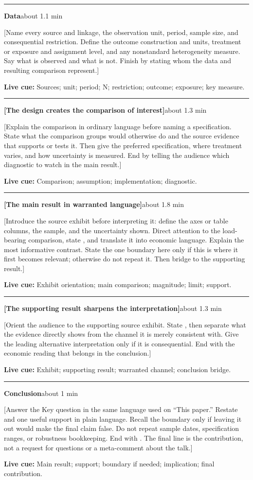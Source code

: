 \documentclass[11pt]{article}
\newcommand{\Cue}[1]{\par\nobreak\smallskip\noindent\textcolor{ScriptGray}{\footnotesize
  \textbf{Live cue:} #1}\par}
\newcommand{\scriptframe}[3]{%
  \Needspace{9\baselineskip}%
  \par\medskip\noindent\textcolor{ScriptBlue}{\rule{\linewidth}{0.55pt}}%
  \par\smallskip\noindent
  \textbf{#1}\hfill\textcolor{ScriptGray}{\small #2}\par\smallskip
  #3\par}
\begin{document}
\scriptframe{Data}{about 1.1 min}{%
  [Name every source and linkage, the observation unit, period, sample size,
  and consequential restriction. Define the outcome construction and units,
  treatment or exposure and assignment level, and any nonstandard
  heterogeneity measure. Say what is observed and what is not. Finish by
  stating whom the data and resulting comparison represent.]
  \Cue{Sources; unit; period; N; restriction; outcome; exposure; key measure.}
}

\scriptframe{[The design creates the comparison of interest]}{about 1.3 min}{%
  [Explain the comparison in ordinary language before naming a specification.
  State what the comparison groups would otherwise do and the source evidence
  that supports or tests it. Then give the preferred specification, where
  treatment varies, and how uncertainty is measured. End by telling the audience which diagnostic to watch in
  the main result.]
  \Cue{Comparison; assumption; implementation; diagnostic.}
}

\scriptframe{[The main result in warranted language]}{about 1.8 min}{%
  [Introduce the source exhibit before interpreting it: define the axes or
  table columns, the sample, and the uncertainty shown. Direct attention to the
  load-bearing comparison, state \ResultHeadlineSpoken, and translate it into
  economic language. Explain the most informative contrast. State the one
  boundary here only if this is where it first becomes relevant; otherwise do
  not repeat it. Then bridge to the supporting result.]
  \Cue{Exhibit orientation; main comparison; magnitude; limit; support.}
}

\scriptframe{[The supporting result sharpens the interpretation]}{about 1.3 min}{%
  [Orient the audience to the supporting source exhibit. State
  \ResultSupportSpoken, then separate what the evidence directly shows from the
  channel it is merely consistent with. Give the leading alternative
  interpretation only if it is consequential. End with the economic reading
  that belongs in the conclusion.]
  \Cue{Exhibit; supporting result; warranted channel; conclusion bridge.}
}


\begin{samepage}
\scriptframe{Conclusion}{about 1 min}{%
  [Answer the Key question in the same language used on ``This paper.'' Restate
  \ResultHeadlineSpoken and one useful support in plain language. Recall the
  boundary only if leaving it out would make the final claim false. Do not repeat sample dates,
  specification ranges, or robustness bookkeeping. End with
  \ResultImplicationSpoken. The final line is the contribution, not a request
  for questions or a meta-comment about the talk.]
  \Cue{Main result; support; boundary if needed; implication; final contribution.}
}
\end{samepage}
\end{document}

